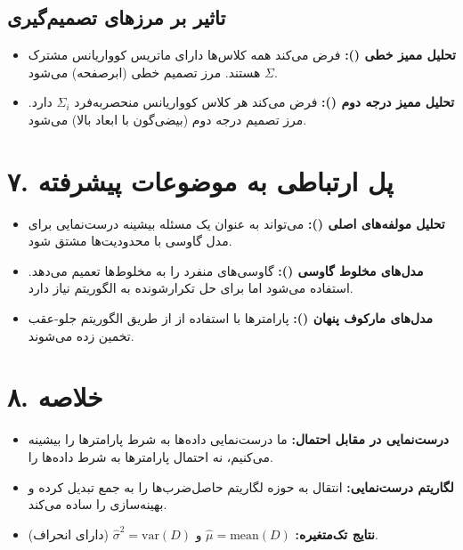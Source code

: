 \documentclass{article}
\begin{document}
\subsection*{تاثیر بر مرزهای تصمیم‌گیری}
\begin{itemize}
    \item \textbf{تحلیل ممیز خطی ():} فرض می‌کند همه کلاس‌ها دارای ماتریس کوواریانس مشترک $\Sigma$ هستند. مرز تصمیم خطی (ابرصفحه) می‌شود.
    \item \textbf{تحلیل ممیز درجه دوم ():} فرض می‌کند هر کلاس کوواریانس منحصربه‌فرد $\Sigma_i$ دارد. مرز تصمیم درجه دوم (بیضی‌گون با ابعاد بالا) می‌شود.
\end{itemize}

\section*{۷. پل ارتباطی به موضوعات پیشرفته}
\begin{itemize}
    \item \textbf{تحلیل مولفه‌های اصلی ():} می‌تواند به عنوان یک مسئله بیشینه درست‌نمایی برای مدل گاوسی با محدودیت‌ها مشتق شود.
    \item \textbf{مدل‌های مخلوط گاوسی ():} گاوسی‌های منفرد را به مخلوط‌ها تعمیم می‌دهد.  استفاده می‌شود اما برای حل تکرارشونده به الگوریتم  نیاز دارد.
    \item \textbf{مدل‌های مارکوف پنهان ():} پارامترها با استفاده از  از طریق الگوریتم جلو-عقب تخمین زده می‌شوند.
\end{itemize}

\section*{۸. خلاصه}
\begin{itemize}
    \item \textbf{درست‌نمایی در مقابل احتمال:} ما درست‌نمایی داده‌ها به شرط پارامترها را بیشینه می‌کنیم، نه احتمال پارامترها به شرط داده‌ها را.
    \item \textbf{لگاریتم درست‌نمایی:} انتقال به حوزه لگاریتم حاصل‌ضرب‌ها را به جمع تبدیل کرده و بهینه‌سازی را ساده می‌کند.
    \item \textbf{نتایج تک‌متغیره:} $\hat{\mu} = \text{mean}(D)$ و $\hat{\sigma}^2 = \text{var}(D)$ (دارای انحراف).
\end{itemize}
\end{document}
